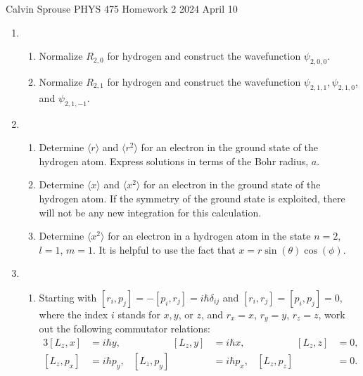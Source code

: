 \documentclass[a4paper, 12pt]{config/homework}
\begin{document}
\noindent
\hfill Calvin Sprouse \hfill PHYS 475 Homework 2 \hfill 2024 April 10 \hfill

\begin{enumerate}
\item \begin{enumerate}[label=(\alph*)]
\item Normalize \(R_{2,0}\) for hydrogen and construct the wavefunction \(\psi_{2,0,0}\). \bigskip



\item Normalize \(R_{2,1}\) for hydrogen and construct the wavefunction \(\psi_{2,1,1}, \psi_{2,1,0}\), and \(\psi_{2,1,-1}\). \bigskip



\end{enumerate}
\pagebreak
\item \begin{enumerate}[label=(\alph*)]
\item Determine \(\langle r \rangle\) and \(\langle r^2 \rangle\) for an electron in the ground state of the hydrogen atom. Express solutions in terms of the Bohr radius, \(a\). \bigskip



\item Determine \(\langle x \rangle\) and \(\langle x^2 \rangle\) for an electron in the ground state of the hydrogen atom. If the symmetry of the ground state is exploited, there will not be any new integration for this calculation. \bigskip



\item Determine \(\langle x^2 \rangle\) for an electron in a hydrogen atom in the state \(n=2\), \(l=1\), \(m=1\). It is helpful to use the fact that \(x=r\sin(\theta)\cos(\phi)\). \bigskip



\end{enumerate}
\pagebreak
\item \begin{enumerate}[label=(\alph*)]
\item Starting with \([r_i,p_j]=-[p_i,r_j]=i\hbar\delta_{ij}\) and \([r_i,r_j]=[p_i,p_j]=0\), where the index \(i\) stands for \(x,y\), or \(z\), and \(r_x=x\), \(r_y=y\), \(r_z=z\), work out the following commutator relations:
\begin{alignat*}{3}
[L_z,x] & =i\hbar y, & \qquad\qquad [L_z,y] & =i\hbar x, & \qquad\qquad [L_z,z] & =0, \\
[L_z,p_x]&=i\hbar p_y, & [L_z, p_y]&=i\hbar p_x, & [L_z, p_z]&=0.
\end{alignat*} \bigskip




\end{enumerate}
\end{enumerate}
\end{document}
